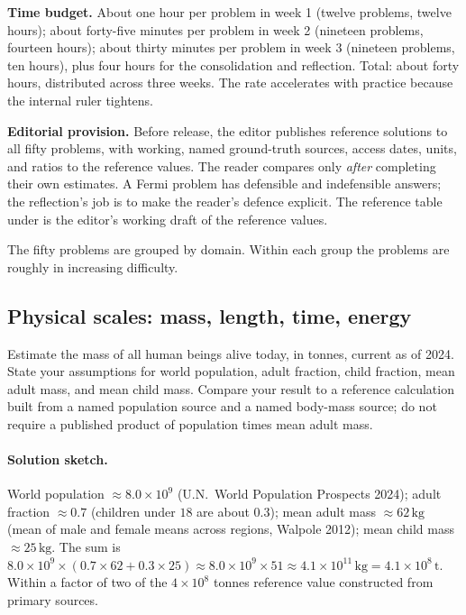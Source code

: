 \begin{project}
\textbf{Time budget.}
About one hour per problem in week 1 (twelve problems, twelve
hours); about forty-five minutes per problem in week 2 (nineteen
problems, fourteen hours); about thirty minutes per problem in
week 3 (nineteen problems, ten hours), plus four hours for the
consolidation and reflection. Total: about forty hours, distributed
across three weeks. The rate accelerates with practice because the
internal ruler tightens.

\textbf{Editorial provision.}
Before release, the editor publishes reference solutions to all
fifty problems, with working, named ground-truth sources, access
dates, units, and ratios to the reference values. The reader
compares only \emph{after} completing their own estimates. A Fermi
problem has defensible and indefensible answers; the reflection's
job is to make the reader's defence explicit. The reference table
under 
is the editor's working draft of the reference values.

\end{project}



The fifty problems are grouped by domain. Within each group the
problems are roughly in increasing difficulty.

\subsection*{Physical scales: mass, length, time, energy}

\begin{exercise}
Estimate the mass of all human beings alive today, in tonnes,
current as of 2024. State your assumptions for world population,
adult fraction, child fraction, mean adult mass, and mean child
mass. Compare your result to a reference calculation built from a
named population source and a named body-mass source; do not
require a published product of population times mean adult mass.
\end{exercise}

\paragraph{Solution sketch.}
World population $\approx 8.0 \times 10^{9}$ (U.N.\ World
Population Prospects 2024); adult fraction $\approx 0.7$ (children
under $18$ are about $0.3$); mean adult mass $\approx 62
\,\si{\kilo\gram}$ (mean of male and female means across regions,
Walpole 2012); mean child mass $\approx 25 \,\si{\kilo\gram}$. The
sum is $8.0 \times 10^{9} \times (0.7 \times 62 + 0.3 \times 25)
\approx 8.0 \times 10^{9} \times 51 \approx 4.1 \times 10^{11}
\,\si{\kilo\gram} = 4.1 \times 10^{8} \,\si{\tonne}$. Within a
factor of two of the $4 \times 10^{8}$ tonnes reference value
constructed from primary sources.

